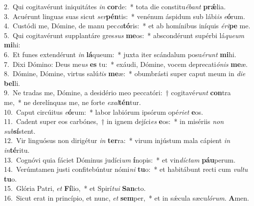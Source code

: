 {2.~}Qui cogitavérunt iniquitátes \textit{in} \textbf{cor}de:~* tota die constitu\textit{é}\textit{bant} \textbf{prǽ}lia.\\
{3.~}Acuérunt linguas suas sicut \textit{ser}\textbf{pén}tis:~* venénum áspidum sub lábi\textit{is} \textit{e}\textbf{ó}rum.\\
{4.~}Custódi me, Dómine, de manu pec\textit{ca}\textbf{tó}ris:~* et ab homínibus iníquis \textit{é}\textit{ri}\textbf{pe} me.\\
{5.~}Qui cogitavérunt supplantáre gres\textit{sus} \textbf{me}os:~* abscondérunt supérbi lá\textit{que}\textit{um} \textbf{mi}hi:\\
{6.~}Et funes extendérunt \textit{in} \textbf{lá}queum:~* juxta iter scándalum posu\textit{é}\textit{runt} \textbf{mi}hi.\\
{7.~}Dixi Dómino: Deus me\textit{us} \textbf{es} tu:~* exáudi, Dómine, vocem deprecati\textit{ó}\textit{nis} \textbf{me}æ.\\
{8.~}Dómine, Dómine, virtus salú\textit{tis} \textbf{me}æ:~* obumbrásti super caput meum in \textit{di}\textit{e} \textbf{bel}li.\\
{9.~}Ne tradas me, Dómine, a desidério meo peccatóri:~† cogitavé\textit{runt} \textbf{con}tra me,~* ne derelínquas me, ne forte \textit{e}\textit{xal}\textbf{tén}tur.\\
{10.~}Caput circúitus \textit{e}\textbf{ó}rum:~* labor labiórum ipsórum opé\textit{ri}\textit{et} \textbf{e}os.\\
{11.~}Cadent super eos carbónes,~† in ignem dejíci\textit{es} \textbf{e}os:~* in misériis \textit{non} \textit{sub}\textbf{sí}stent.\\
{12.~}Vir linguósus non dirigétur \textit{in} \textbf{ter}ra:~* virum injústum mala cápient \textit{in} \textit{in}\textbf{té}ritu.\\
{13.~}Cognóvi quia fáciet Dóminus judíci\textit{um} \textbf{í}nopis:~* et vin\textit{dí}\textit{ctam} \textbf{páu}perum.\\
{14.~}Verúmtamen justi confitebúntur nómi\textit{ni} \textbf{tu}o:~* et habitábunt recti cum \textit{vul}\textit{tu} \textbf{tu}o.\\
{15.~}Glória Patri, \textit{et} \textbf{Fí}lio,~* et Spirí\textit{tu}\textit{i} \textbf{San}cto.\\
{16.~}Sicut erat in princípio, et nunc, \textit{et} \textbf{sem}per,~* et in sǽcula sæcu\textit{ló}\textit{rum}. \textbf{A}men.\\

